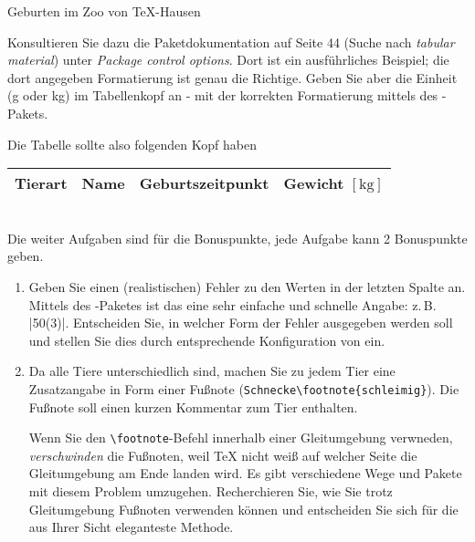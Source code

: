 \documentclass[
	vorläufig=false, 
	blattnr=3,
	ausgabe=2022-10-26,
	abgabe=2022-11-09,
	lösung=true,
	shortverb,
]{../tex/latexkurs-exercise}
\begin{document}
\begin{aufgabe}[6 (+4 Bonus)]{Geburten im Zoo von \TeX -Hausen}
\begin{enumerate}[label=\alph*)]
        Konsultieren Sie dazu die Paketdokumentation auf Seite 44 (Suche nach \emph{tabular material}) unter \emph{Package control options}. Dort ist ein ausführliches Beispiel; die dort angegeben Formatierung ist genau die Richtige. Geben Sie aber die Einheit (g oder kg) im Tabellenkopf an - mit der korrekten Formatierung mittels des -Pakets.
    \end{enumerate}
    Die Tabelle sollte also folgenden Kopf haben
    \begin{table}[h]
        \centering
        \begin{tabular}{llll}
            \toprule
            Tierart & Name & Geburtszeitpunkt & Gewicht $[\mathrm{kg}]$\\
            \midrule
        \end{tabular}
    \end{table}\\
    Die weiter Aufgaben sind für die Bonuspunkte, jede Aufgabe kann 2 Bonuspunkte geben.
    \begin{enumerate}[resume, label=\alph*)]
        \item Geben Sie einen (realistischen) Fehler zu den Werten in der letzten Spalte an. Mittels des -Paketes ist das eine sehr einfache und schnelle Angabe: z.\,B. |50(3)|. Entscheiden Sie, in welcher Form der Fehler ausgegeben werden soll und stellen Sie dies durch entsprechende Konfiguration von  ein.
        \item Da alle Tiere unterschiedlich sind, machen Sie zu jedem Tier eine Zusatzangabe in Form einer Fußnote (\texttt{Schnecke\textbackslash footnote\{schleimig\}}). Die Fußnote soll einen kurzen Kommentar zum Tier enthalten.

        Wenn Sie den \texttt{\textbackslash footnote}-Befehl innerhalb einer Gleitumgebung verwneden, \emph{verschwinden} die Fußnoten, weil \TeX{} nicht weiß auf welcher Seite die Gleitumgebung am Ende landen wird. Es gibt verschiedene Wege und Pakete mit diesem Problem umzugehen. Recherchieren Sie, wie Sie trotz Gleitumgebung Fußnoten verwenden können und entscheiden Sie sich für die aus Ihrer Sicht eleganteste Methode.
    \end{enumerate}
\end{aufgabe}

\end{document}
